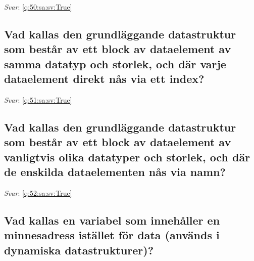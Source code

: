 \documentclass[a4paper,11pt,oneside]{article}
\begin{document}
\begin{sloppypar}
\label{q:50:sa:sv:False}

\vspace{2cm}

\noindent\makebox[\textwidth]{\hrulefill}

\vspace{1cm}

\textit{Svar}: \autoref{q:50:sa:sv:True}



\subsection{Vad kallas den grundl\"aggande datastruktur som best\r{a}r av ett block av dataelement av samma datatyp och storlek, och d\"ar varje dataelement direkt n\r{a}s via ett index?}

\label{q:51:sa:sv:False}

\vspace{2cm}

\noindent\makebox[\textwidth]{\hrulefill}

\vspace{1cm}

\textit{Svar}: \autoref{q:51:sa:sv:True}



\subsection{Vad kallas den grundl\"aggande datastruktur som best\r{a}r av ett block av dataelement av vanligtvis olika datatyper och storlek, och d\"ar de enskilda dataelementen n\r{a}s via namn?}

\label{q:52:sa:sv:False}

\vspace{2cm}

\noindent\makebox[\textwidth]{\hrulefill}

\vspace{1cm}

\textit{Svar}: \autoref{q:52:sa:sv:True}



\subsection{Vad kallas en variabel som inneh\r{a}ller en minnesadress ist\"allet f\"or data (anv\"ands i dynamiska datastrukturer)?}

\label{q:53:sa:sv:False}

\vspace{2cm}


\end{sloppypar}
\end{document}
